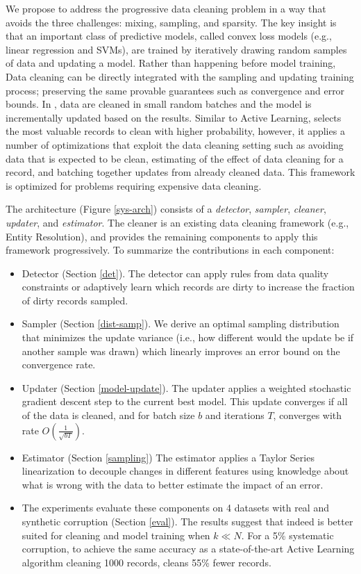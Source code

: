 We propose \sys to address the progressive data cleaning problem in a way that avoids the three challenges: mixing, sampling, and sparsity.
The key insight is that an important class of predictive models, called convex loss models (e.g., linear regression and SVMs), are trained by iteratively drawing random samples of data and updating a model\cite{bertsekas2011incremental}.
Rather than happening before model training, Data cleaning can be directly integrated with the sampling and updating training process; preserving the same provable guarantees such as convergence and error bounds.
In \sys, data are cleaned in small random batches and the model is incrementally updated based on the results.
Similar to Active Learning, \sys selects the most valuable records to clean with higher probability, however, it applies a number of optimizations that exploit the data cleaning setting such as avoiding data that is expected to be clean, estimating of the effect of data cleaning for a record, and batching together updates from already cleaned data.
This framework is optimized for problems requiring expensive data cleaning.

The \sys architecture (Figure \ref{sys-arch}) consists of a \emph{detector}, \emph{sampler}, \emph{cleaner}, \emph{updater}, and \emph{estimator}.
The cleaner is an existing data cleaning framework (e.g., Entity Resolution), and \sys provides the remaining components to apply this framework progressively.
To summarize the contributions in each component:
\begin{itemize}[noitemsep]
\item Detector (Section \ref{det}). The detector can apply rules from data quality constraints or adaptively learn which records are dirty to increase the fraction of dirty records sampled.
\item Sampler (Section \ref{dist-samp}). We derive an optimal sampling distribution that minimizes the update variance (i.e., how different would the update be if another sample was drawn) which linearly improves an error bound on the convergence rate.
\item Updater (Section \ref{model-update}). The updater applies a weighted stochastic gradient descent step to the current best model. This update converges if all of the data is cleaned, and for batch size $b$ and iterations $T$, converges with rate $O(\frac{1}{\sqrt{bT}})$. 
\item Estimator (Section \ref{sampling}) The estimator applies a Taylor Series linearization to decouple changes in different features using knowledge about what is wrong with the data to better estimate the impact of an error.
\item The experiments evaluate these components on 4 datasets with real and synthetic corruption (Section \ref{eval}). The results suggest that indeed \sys is better suited for cleaning and model training when $k\ll N$. For a 5\%  systematic corruption, to achieve the same accuracy as a state-of-the-art Active Learning algorithm cleaning 1000 records, \sys cleans 55\% fewer records.
\end{itemize}






